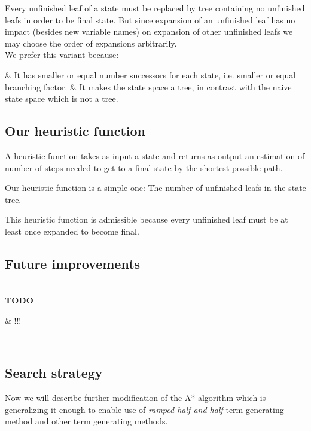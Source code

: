 \documentclass[12pt,a4paper]{report}
\newenvironment{enum}
{\begin{easylist}[itemize]}
{\end{easylist}}
\newenvironment{todo}
{ ~\\[0.5em]
  {\color{red}\textbf{TODO}}
  \begin{easylist}[itemize]}
{ \end{easylist}
  ~}
\begin{document}
Every unfinished leaf of a state must be replaced by 
tree containing no unfinished leafs in order to be final state. 
But since expansion of an unfinished leaf has no impact 
(besides new variable names) on expansion of other unfinished
leafs we may choose the order of expansions arbitrarily. \\

We prefer this variant because:
 \begin{enum}
 	& It has smaller or equal number successors for each state, 
 	  i.e. smaller or equal branching factor.
 	& It makes the state space a tree, in contrast with
 	  the naive state space which is not a tree. 
 \end{enum}

 



\subsection{Our heuristic function}

A heuristic function takes as input a state and returns as output an estimation of number
of steps needed to get to a final state by the shortest possible path.

Our heuristic function is a simple one: The number of unfinished leafs in the state tree.

This heuristic function is admissible because every unfinished
leaf must be at least once expanded to become final. 


\subsection{Future improvements}

\begin{todo}
& !!!
\end{todo}



\subsection{Search strategy}

Now we will describe further modification of the A* algorithm 
which is generalizing it enough to enable use of \textit{ramped half-and-half}
term generating method and other term generating methods.\\
\end{document}
